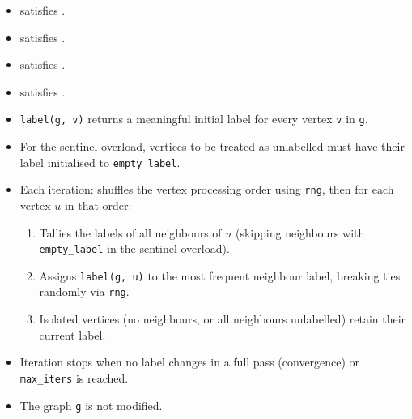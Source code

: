 \begin{itemdescr}
      \pnum\mandates
            \begin{itemize}
                  \item {} satisfies .
                  \item {} satisfies .
                  \item {} satisfies
                        .
                  \item {} satisfies .
            \end{itemize}
      \pnum\preconditions
            \begin{itemize}
                  \item \lstinline{label(g, v)} returns a meaningful initial label for every vertex \lstinline{v} in \lstinline{g}.
                  \item For the sentinel overload, vertices to be treated as unlabelled must have
                        their label initialised to \lstinline{empty_label}.
            \end{itemize}
      \pnum\effects
            \begin{itemize}
                  \item Each iteration: shuffles the vertex processing order using \lstinline{rng},
                        then for each vertex $u$ in that order:
                  \begin{enumerate}
                        \item Tallies the labels of all neighbours of $u$ (skipping neighbours
                              with \lstinline{empty_label} in the sentinel overload).
                        \item Assigns \lstinline{label(g, u)} to the most frequent neighbour label,
                              breaking ties randomly via \lstinline{rng}.
                        \item Isolated vertices (no neighbours, or all neighbours unlabelled)
                              retain their current label.
                  \end{enumerate}
                  \item Iteration stops when no label changes in a full pass (convergence) or
                        \lstinline{max_iters} is reached.
                  \item The graph \lstinline{g} is not modified.

\end{itemize}
\end{itemdescr}
